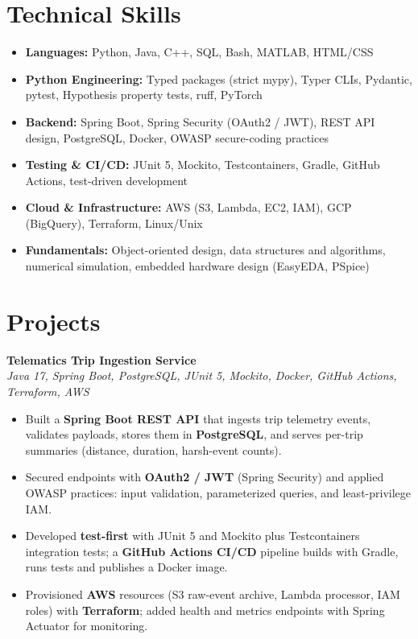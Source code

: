 \documentclass[10pt,letterpaper]{article}
\newcommand{\project}[2]{\textbf{#1}\\\textit{#2}\par}
\begin{document}
\section*{Technical Skills}
\begin{itemize}\item \textbf{Languages:} Python, Java, C++, SQL, Bash, MATLAB, HTML/CSS\item \textbf{Python Engineering:} Typed packages (strict mypy), Typer CLIs, Pydantic, pytest, Hypothesis property tests, ruff, PyTorch\item \textbf{Backend:} Spring Boot, Spring Security (OAuth2 / JWT), REST API design, PostgreSQL, Docker, OWASP secure-coding practices\item \textbf{Testing \& CI/CD:} JUnit 5, Mockito, Testcontainers, Gradle, GitHub Actions, test-driven development\item \textbf{Cloud \& Infrastructure:} AWS (S3, Lambda, EC2, IAM), GCP (BigQuery), Terraform, Linux/Unix\item \textbf{Fundamentals:} Object-oriented design, data structures and algorithms, numerical simulation, embedded hardware design (EasyEDA, PSpice)\end{itemize}
\section*{Projects}
\project{Telematics Trip Ingestion Service}{Java 17, Spring Boot, PostgreSQL, JUnit 5, Mockito, Docker, GitHub Actions, Terraform, AWS}
\begin{itemize}\item Built a \textbf{Spring Boot REST API} that ingests trip telemetry events, validates payloads, stores them in \textbf{PostgreSQL}, and serves per-trip summaries (distance, duration, harsh-event counts).\item Secured endpoints with \textbf{OAuth2 / JWT} (Spring Security) and applied OWASP practices: input validation, parameterized queries, and least-privilege IAM.\item Developed \textbf{test-first} with JUnit 5 and Mockito plus Testcontainers integration tests; a \textbf{GitHub Actions CI/CD} pipeline builds with Gradle, runs tests and publishes a Docker image.\item Provisioned \textbf{AWS} resources (S3 raw-event archive, Lambda processor, IAM roles) with \textbf{Terraform}; added health and metrics endpoints with Spring Actuator for monitoring.\end{itemize}\vspace{2pt}
\end{document}
